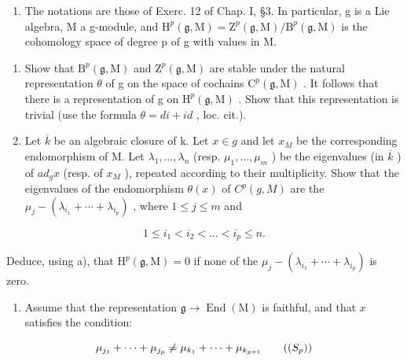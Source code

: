 \begin{enumerate}
\def\labelenumi{\arabic{enumi})}
\setcounter{enumi}{5}
\tightlist
\item
  The notations are those of Exerc. 12 of Chap. I, §3. In particular, g is a Lie algebra, M a g-module, and \(\mathrm{H}^{p}(\mathfrak{g},\mathrm{M})=\mathrm{Z}^{p}(\mathfrak{g},\mathrm{M})/\mathrm{B}^{p}(\mathfrak{g},\mathrm{M})\) is the cohomology space of degree p of g with values in M.
\end{enumerate}

\begin{enumerate}
\def\labelenumi{\alph{enumi})}
\item
  Show that \(\mathrm{B}^{p}(\mathfrak{g},\mathrm{M})\) and \(\mathrm{Z}^{p}(\mathfrak{g},\mathrm{M})\) are stable under the natural representation \(\theta\) of g on the space of cochains \(\mathrm{C}^{p}(\mathfrak{g},\mathrm{M})\) . It follows that there is a representation of g on \(\mathrm{H}^{p}(\mathfrak{g},\mathrm{M})\) . Show that this representation is trivial (use the formula \(\theta = di + id\) , loc. cit.).
\item
  Let \(\overline{k}\) be an algebraic closure of k. Let \(x \in g\) and let \(x_{M}\) be the corresponding endomorphism of M. Let \(\lambda_{1}, \ldots, \lambda_{n}\) (resp. \(\mu_{1}, \ldots, \mu_{m}\) ) be the eigenvalues (in \(\overline{k}\) ) of \(ad_{g}x\) (resp. of \(x_{M}\) ), repeated according to their multiplicity. Show that the eigenvalues of the endomorphism \(\theta(x)\) of \(C^{p}(g, M)\) are the \(\mu_{j} - (\lambda_{i_{1}} + \cdots + \lambda_{i_{p}})\) , where \(1 \leq j \leq m\) and
\end{enumerate}

\[
1 \leq i _ {1} <   i _ {2} <   \dots <   i _ {p} \leq n.
\]

Deduce, using a), that \(\mathrm{H}^{p}(\mathfrak{g},\mathrm{M})=0\) if none of the \(\mu_{j}-(\lambda_{i_{1}}+\cdots+\lambda_{i_{p}})\) is zero.

\begin{enumerate}
\def\labelenumi{\alph{enumi})}
\setcounter{enumi}{2}
\tightlist
\item
  Assume that the representation \(\mathfrak{g} \to \operatorname{End}(\mathrm{M})\) is faithful, and that \(x\) satisfies the condition:
\end{enumerate}

\[
\mu_ {j _ {1}} + \dots + \mu_ {j _ {p}} \neq \mu_ {k _ {1}} + \dots + \mu_ {k _ {p + 1}}\tag{($S_{p}$)}
\]


